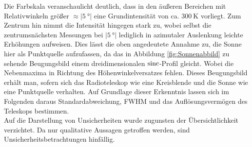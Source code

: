     Die Farbskala veranschaulicht deutlich, dass in den äußeren Bereichen mit Relativwinkeln größer $\approx \vert \SI{5}{\degree}\vert$ eine Grundintensität von ca. $\SI{300}{\kelvin}$ vorliegt.
    Zum Zentrum hin nimmt die Intensität hingegen stark zu,
    wobei selbst die zentrumsnächsten Messungen bei $\vert\SI{5}{\degree}\vert$ lediglich in azimutaler Auslenkung leichte Erhöhungen aufweisen.
    Dies lässt die oben angedeutete Annahme zu, die Sonne hier als Punktquelle aufzufassen, da das in Abbildung \ref{fig:Sonnenabbild} zu sehende Beugungsbild einem dreidimensionalen $\operatorname{sinc}$-Profil gleicht. Wobei die Nebenmaxima in Richtung des Höhenwinkelversatzes fehlen.
    Dieses Beugungsbild erhält man, sofern sich das Radioteleskop wie eine Kreisblende und die Sonne wie eine Punktquelle verhalten. Auf Grundlage dieser Erkenntnis lassen sich im Folgenden daraus Standardabweichung, FWHM und das Auflösungsvermögen des Teleskops bestimmen.\\
    Auf die Darstellung von Unsicherheiten wurde zugunsten der Übersichtlichkeit verzichtet. Da nur qualitative Aussagen getroffen werden, sind Unsicherheitsbetrachtungen hinfällig.

